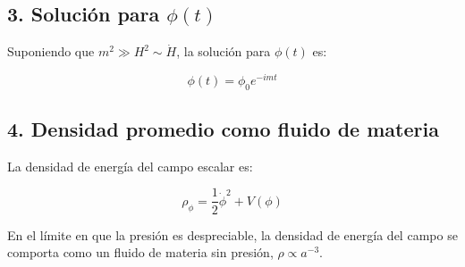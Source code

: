 \documentclass{article}
\begin{document}
\subsection{3. Solución para \( \phi(t) \)}

Suponiendo que \( m^2 \gg H^2 \sim \dot{H} \), la solución para \( \phi(t) \) es:

\[
\phi(t) = \phi_0 e^{-imt}
\]

\subsection{4. Densidad promedio como fluido de materia}

La densidad de energía del campo escalar es:

\[
\rho_\phi = \frac{1}{2} \dot{\phi}^2 + V(\phi)
\]

En el límite en que la presión es despreciable, la densidad de energía del campo se comporta como un fluido de materia sin presión, \( \rho \propto a^{-3} \).
\end{document}
